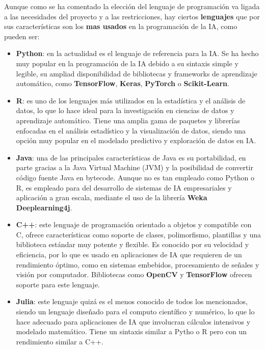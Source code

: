 Aunque como se ha comentado la elección del lenguaje de programación va ligada a las necesidades del proyecto y a las restricciones, hay ciertos \textbf{lenguajes} que por sus características son los \textbf{mas usados} en la programación de la IA, como pueden ser:

\begin{itemize}
	\item \textbf{Python}: en la actualidad es el lenguaje de referencia para la IA. Se ha hecho muy popular en la programación de la IA  debido a su sintaxis simple y legible, su ampliad disponibilidad de bibliotecas y frameworks de aprendizaje automático, como \textbf{TensorFlow}, \textbf{Keras}, \textbf{PyTorch} o \textbf{Scikit-Learn}.
	\item \textbf{R}: es uno de los lenguajes más utilizados en la estadística y el análisis de datos, lo que lo hace ideal para la investigación en ciencias de datos y aprendizaje automático. Tiene una amplia gama de paquetes y librerías enfocadas en el análisis estadístico y la visualización de datos, siendo una opción muy popular en el modelado predictivo y exploración de datos en IA.
	\item \textbf{Java}: una de las principales características de Java es su portabilidad, en parte gracias a la Java Virtual Machine (JVM) y la posibilidad de convertir código fuente Java en bytecode. Aunque no es tan empleado como Python o R, es empleado para del desarrollo de sistemas de IA empresariales y aplicación a gran escala, mediante el uso de la librería \textbf{Weka Deeplearning4j}.
	\item \textbf{C++}: este lenguaje de programación orientado a objetos y compatible con C, ofrece características como soporte de clases, polimorfismo, plantillas y una biblioteca estándar muy potente y flexible. Es conocido por su velocidad y eficiencia, por lo que es usado en aplicaciones de IA que requieren de un rendimiento óptimo, como en sistemas embebidos, procesamiento de señales y visión por computador. Bibliotecas como \textbf{OpenCV} y \textbf{TensorFlow} ofrecen soporte para este lenguaje.
	\item \textbf{Julia}: este lenguaje quizá es el menos conocido de todos los mencionados, siendo un lenguaje diseñado para el computo científico y numérico, lo que lo hace adecuado para aplicaciones de IA que involucran cálculos intensivos y modelado matemático. Tiene un sintaxis similar a Pytho o R pero con un rendimiento similar a C++.
\end{itemize}

